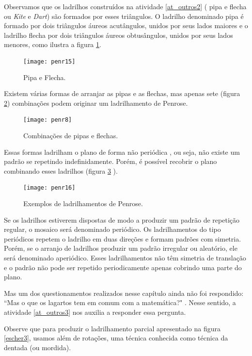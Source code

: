 Observamos que os ladrilhos construídos na atividade \ref{at_outros2} ( pipa e flecha ou  \textit{Kite} e \textit{Dart}) são formados por esses triângulos. O ladrilho denominado pipa é formado por dois triângulos áureos acutângulos, unidos por seus lados maiores e o ladrilho flecha por dois triângulos áureos obtusângulos, unidos por seus lados menores, como ilustra a figura \ref{penr_15}. 

 \begin{figure}[H]
	\centering
	\texttt{[image: penr15]}
	\label{penr_15}
\caption{Pipa e Flecha.}
	\end{figure}


Existem várias formas de arranjar as pipas e as flechas, mas apenas sete (figura \ref{penr_8}) combinações podem originar um ladrilhamento de  Penrose.

 \begin{figure}[H]
	\centering
	\texttt{[image: penr8]}
	\label{penr_8}
\caption{Combinações de pipas e flechas.}
	\end{figure}



Essas formas  ladrilham o plano de forma não periódica , ou seja, não existe um padrão se repetindo indefinidamente. Porém, é possível recobrir o plano combinando esses ladrilhos (figura \ref{penr_16} ). 

 \begin{figure}[H]
	\centering
	\texttt{[image: penr16]}
	\label{penr_16}
\caption{Exemplos de ladrilhamentos de Penrose.}
	\end{figure}

Se os ladrilhos estiverem dispostas de modo a produzir um padrão de repetição regular, o mosaico será denominado periódico. Os ladrilhamentos do tipo periódicos repetem o ladrilho em duas direções e formam padrões com simetria. Porém, se o arranjo de ladrilhos produzir um padrão irregular ou aleatório, ele será denominado aperiódico. Esses ladrilhamentos não têm simetria de translação e o padrão não pode ser repetido periodicamente apenas cobrindo uma parte do plano.

Mas um dos questionamentos realizados nesse capítulo ainda não foi respondido: “Mas o que os lagartos tem em comum com a matemática?" . Nesse sentido, a atividade \ref{at_outros3} nos auxilia a responder essa pergunta.

Observe que para produzir o ladrilhamento parcial apresentado na figura  \ref{escher3}, usamos além de rotações, uma técnica conhecida como técnica da dentada (ou mordida).

